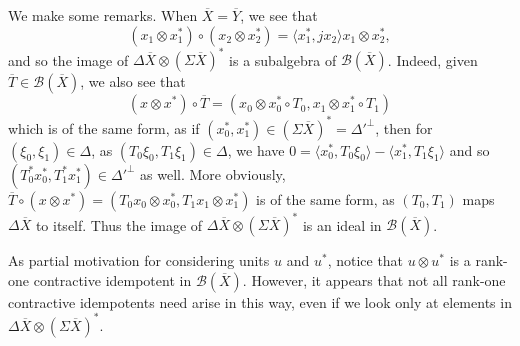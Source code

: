 \documentclass[a4paper,11pt]{article}
\theoremstyle{plain}
\theoremstyle{remark}
\newcommand{\mc}[1]{\mathcal{#1}}
\newcommand{\ip}[2]{{\langle {#1} , {#2} \rangle}}
\begin{document}
We make some remarks.  When $\overline X = \overline Y$, we see that
\[ (x_1\otimes x_1^*) \circ (x_2\otimes x_2^*) = \ip{x_1^*}{jx_2} x_1 \otimes x_2^*, \]
and so the image of $\Delta\overline X \otimes (\Sigma\overline X)^*$ is a subalgebra of $\mc B(\overline X)$.  Indeed, given $\overline T\in\mc B(\overline X)$, we also see that
\[ (x\otimes x^*)\circ\overline T = (x_0 \otimes x^*_0\circ T_0, x_1 \otimes x^*_1\circ T_1) \]
which is of the same form, as if $(x_0^*, x_1^*) \in (\Sigma\overline X)^* = \Delta'^\perp$, then for $(\xi_0,\xi_1) \in \Delta$, as $(T_0\xi_0, T_1\xi_1)\in\Delta$, we have $0 = \ip{x_0^*}{T_0\xi_0} - \ip{x_1^*}{T_1\xi_1}$ and so $(T_0^*x_0^*, T_1^*x_1^*) \in \Delta'^\perp$ as well.  More obviously, $\overline T \circ (x\otimes x^*) = (T_0x_0\otimes x_0^*, T_1x_1\otimes x_1^*)$ is of the same form, as $(T_0, T_1)$ maps $\Delta\overline X$ to itself.  Thus the image of $\Delta\overline X \otimes (\Sigma\overline X)^*$ is an ideal in $\mc B(\overline X)$.

As partial motivation for considering units $u$ and $u^*$, notice that $u\otimes u^*$ is a rank-one contractive idempotent in $\mc B(\overline X)$.  However, it appears that not all rank-one contractive idempotents need arise in this way, even if we look only at elements in $\Delta\overline X \otimes (\Sigma\overline X)^*$.
\end{document}
